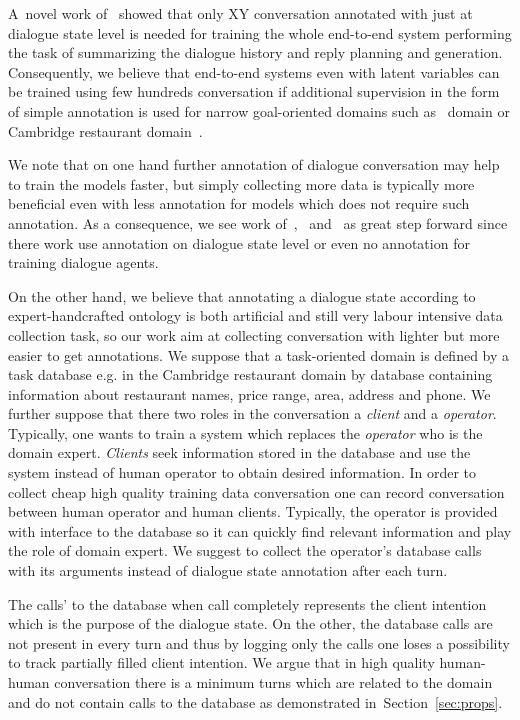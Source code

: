 \documentclass[runningheads,a4paper]{llncs}
\begin{document}
A~novel work of~\cite{Wen} showed that only XY conversation annotated with just at dialogue state level is needed for training the whole end-to-end system performing the task of summarizing the dialogue history and reply planning and generation.
Consequently, we believe that end-to-end systems even with latent variables can be trained using few hundreds conversation if additional supervision in the form of simple annotation is used for narrow goal-oriented domains such as~\cite{Wen} domain or Cambridge restaurant domain~\cite{DSTC2}.

We note that on one hand further annotation of dialogue conversation may help to train the models faster, but simply collecting more data is typically more beneficial even with less annotation for models which does not require such annotation.
As a consequence, we see work of~\cite{Wen},~\cite{Borders} and~\cite{Williams} as great step forward since there work use annotation on dialogue state level or even no annotation for training dialogue agents.

On the other hand, we believe that annotating a dialogue state according to expert-handcrafted ontology is both artificial and still very labour intensive data collection task, so our work aim at collecting conversation with lighter but more easier to get annotations.
We suppose that a task-oriented  domain is defined by a task database e.g. in the Cambridge restaurant domain by database containing information about restaurant names, price range, area, address and phone.
We further suppose that there two roles in the conversation a {\it client} and a {\it operator}.
Typically, one wants to train a system which replaces the {\it operator} who is the domain expert.
{\it Clients} seek information stored in the database and use the system instead of human operator to obtain desired information.
In order to collect cheap high quality training data conversation one can record conversation between human operator and human clients.
Typically, the operator is provided with interface to the database so it can quickly find relevant information and play the role of domain expert.
We suggest to collect the operator's database calls with its arguments instead of dialogue state annotation after each turn.

The calls' to the database when call completely represents the client intention which is the purpose of the dialogue state.
On the other, the database calls are not present in every turn and thus by logging only the calls one loses a possibility to track partially filled client intention.
We argue that in high quality human-human conversation there is a minimum turns which are related to the domain and do not contain calls to the database as demonstrated in~Section~\ref{sec:props}.
\end{document}
